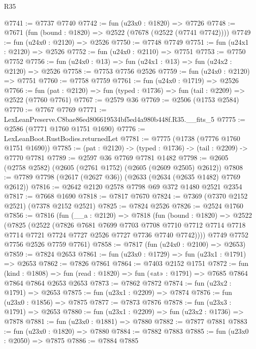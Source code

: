 \begin{lexlean}{R35}
\begin{coremodule}
@7741 := @7737 @7740
@7742 := fun (u23x0 : @1820) => @7726
@7748 := @7671 (fun (bound : @1820) => @2522 (@7678 (@2522 (@7741 @7742))))
@7749 := fun (u24x0 : @2120) => @2526
@7750 := @7748 @7749
@7751 := fun (u24x1 : @2120) => @2526
@7752 := fun (u24x0 : @2110) => @7751
@7753 := @7750 @7752
@7756 := fun (u24x0 : @13) => fun (u24x1 : @13) => fun (u24x2 : @2120) => @2526
@7758 := @7753 @7756 @2526
@7759 := fun (u24x0 : @2120) => @7751
@7760 := @7758 @7759
@7761 := fun (u24x0 : @1719) => @2526
@7766 := fun (pat : @2120) => fun (typed : @1736) => fun (tail : @2209) => @2522 (@7760 @7761)
@7767 := @2579 @36
@7769 := @2506 (@1753 @2584)
@7770 := @7767 @7769
@7771 := LexLeanPreserve.C8bae86ed806619534bf5ed4a980b448f.R35.__fits_5
@7775 := @2586 (@7771 @1760 @1751 @1690)
@7776 := LexLeanBoot.RustBodies.returnedLet
@7781 := @7775 (@1738 (@7776 @1760 @1751 @1690))
@7785 := (pat : @2120) -> (typed : @1736) -> (tail : @2209) -> @7770 @7781
@7789 := @2597 @36 @7769 @7781 @1482
@7798 := @2605 (@2758 @2582) (@2605 (@2761 @1752) (@2605 (@2609 @2505) @2612))
@7808 := @7789 @7798 (@2617 (@2627 @36)) (@2633 (@2634 (@2635 @1482) @7769 @2612))
@7816 := @2642 @2120 @2578 @7798 @69 @372 @1480 @2521 @2354
@7817 := @7668 @1690
@7818 := @7817 @7670
@7824 := @7369 (@7370 @2152 @2521) (@7378 @2152 @2521)
@7825 := @7824 @2526
@7826 := @2524 @1760
@7856 := @7816
    (fun (__a : @2120) =>
    @7818
      (fun (bound : @1820) =>
      @2522
        (@7825
          (@2522
            (@7826
              @7681
              @7699
              @7703
              @7708
              @7710
              @7712
              @7714
              @7718
              @7714
              @7721
              @7724
              @7727
              @2526
              @7727
              @7736
              @7740
              @7742))))
      @7749
      @7752
      @7756
      @2526
      @7759
      @7761)
@7858 := @7817 (fun (u24x0 : @2100) => @2653)
@7859 := @7824 @2653
@7861 := fun (u23x0 : @1729) => fun (u23x1 : @1791) => @2653
@7862 := @7826 @7861
@7864 := @7403 @2152 @1751
@7872 := fun (kind : @1808) =>
  fun (read : @1820) => fun («at» : @1791) => @7685 @7864 @7864 @7864 @2653 @2653
@7873 := @7862 @7872
@7874 := fun (u23x2 : @1791) => @2653
@7875 := fun (u23x1 : @2209) => @7874
@7876 := fun (u23x0 : @1856) => @7875
@7877 := @7873 @7876
@7878 := fun (u23x3 : @1791) => @2653
@7880 := fun (u23x1 : @2209) => fun (u23x2 : @1736) => @7878
@7881 := fun (u23x0 : @1881) => @7880
@7882 := @7877 @7881
@7883 := fun (u23x0 : @1820) => @7880
@7884 := @7882 @7883
@7885 := fun (u23x0 : @2050) => @7875
@7886 := @7884 @7885

\end{coremodule}
\end{lexlean}
